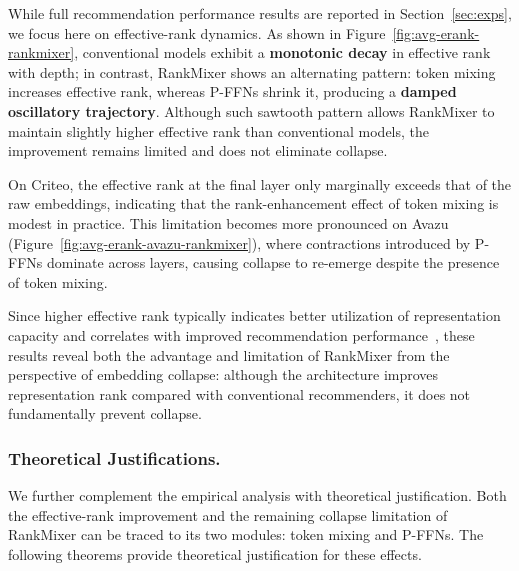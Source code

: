 \documentclass[sigconf,screen]{acmart}
\newcommand{\rankmixer}{RankMixer }
\begin{document}
While full recommendation performance results are reported in Section~\ref{sec:exps}, we focus here on effective-rank dynamics. 
As shown in Figure~\ref{fig:avg-erank-rankmixer}, conventional models exhibit a \textbf{monotonic decay} in effective rank with depth; in contrast, \rankmixer shows an alternating pattern: token mixing increases effective rank, whereas P-FFNs shrink it, producing a \textbf{damped oscillatory trajectory}. 
Although such sawtooth pattern allows \rankmixer to maintain slightly higher effective rank than conventional models, the improvement remains limited and does not eliminate collapse.

On Criteo, the effective rank at the final layer only marginally exceeds that of the raw embeddings, indicating that the rank-enhancement effect of token mixing is modest in practice. 
This limitation becomes more pronounced on Avazu (Figure~\ref{fig:avg-erank-avazu-rankmixer}), where contractions introduced by P-FFNs dominate across layers, causing collapse to re-emerge despite the presence of token mixing.

Since higher effective rank typically indicates better utilization of representation capacity and correlates with improved recommendation performance~\cite{embedding-collapse-1-multiembedding,feagen}, these results reveal both the advantage and limitation of \rankmixer from the perspective of embedding collapse: although the architecture improves representation rank compared with conventional recommenders, it does not fundamentally prevent collapse.



\subsubsection*{\bf Theoretical Justifications.} We further complement the empirical analysis with theoretical justification. 
Both the effective-rank improvement and the remaining collapse limitation of \rankmixer can be traced to its two modules: token mixing and P-FFNs. 
The following theorems provide theoretical justification for these effects.
\end{document}
